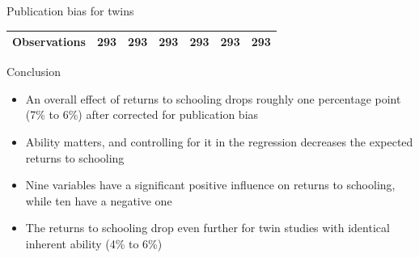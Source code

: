 \documentclass{beamer} %
\begin{document}
\begin{frame}{Publication bias for twins}
\begin{tiny}
\begin{table}[!htbp]
\begin{tabular}{
                    @{}
                    l*{6}{c}}
                \midrule
                \addlinespace[0.5em]
                Observations                          & 293     & 293     & 293     & 293     & 293     & 293     \\

                \bottomrule
            \end{tabular}
        \end{table}

    \end{tiny}
\end{frame}



\begin{frame}{Conclusion}
    \begin{itemize}
        \item<1-> An overall effect of returns to schooling drops roughly one percentage point (7\% to 6\%) after corrected for publication bias
        \item<2-> Ability matters, and controlling for it in the regression decreases the expected returns to schooling
        \item<3-> Nine variables have a significant positive influence on returns to schooling, while ten have a negative one
        \item<4-> The returns to schooling drop even further for twin studies with identical inherent ability (4\% to 6\%)
    \end{itemize}
\end{frame}





\end{document}
